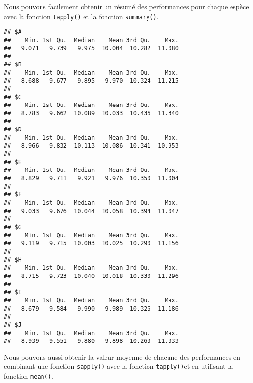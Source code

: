 \documentclass[]{book}
\newenvironment{Shaded}{\begin{snugshade}}{\end{snugshade}}
\newcommand{\KeywordTok}[1]{\textcolor[rgb]{0.13,0.29,0.53}{\textbf{#1}}}
\newcommand{\DataTypeTok}[1]{\textcolor[rgb]{0.13,0.29,0.53}{#1}}
\newcommand{\DecValTok}[1]{\textcolor[rgb]{0.00,0.00,0.81}{#1}}
\newcommand{\ControlFlowTok}[1]{\textcolor[rgb]{0.13,0.29,0.53}{\textbf{#1}}}
\newcommand{\OperatorTok}[1]{\textcolor[rgb]{0.81,0.36,0.00}{\textbf{#1}}}
\newcommand{\NormalTok}[1]{#1}
\theoremstyle{definition}
\theoremstyle{definition}
\theoremstyle{definition}
\theoremstyle{remark}
\begin{document}
Nous pouvons facilement obtenir un résumé des performances pour chaque
espèce avec la fonction \texttt{tapply()} et la fonction
\texttt{summary()}.

\begin{Shaded}
\end{Shaded}

\begin{verbatim}
## $A
##    Min. 1st Qu.  Median    Mean 3rd Qu.    Max. 
##   9.071   9.739   9.975  10.004  10.282  11.080 
## 
## $B
##    Min. 1st Qu.  Median    Mean 3rd Qu.    Max. 
##   8.688   9.677   9.895   9.970  10.324  11.215 
## 
## $C
##    Min. 1st Qu.  Median    Mean 3rd Qu.    Max. 
##   8.783   9.662  10.089  10.033  10.436  11.340 
## 
## $D
##    Min. 1st Qu.  Median    Mean 3rd Qu.    Max. 
##   8.966   9.832  10.113  10.086  10.341  10.953 
## 
## $E
##    Min. 1st Qu.  Median    Mean 3rd Qu.    Max. 
##   8.829   9.711   9.921   9.976  10.350  11.004 
## 
## $F
##    Min. 1st Qu.  Median    Mean 3rd Qu.    Max. 
##   9.033   9.676  10.044  10.058  10.394  11.047 
## 
## $G
##    Min. 1st Qu.  Median    Mean 3rd Qu.    Max. 
##   9.119   9.715  10.003  10.025  10.290  11.156 
## 
## $H
##    Min. 1st Qu.  Median    Mean 3rd Qu.    Max. 
##   8.715   9.723  10.040  10.018  10.330  11.296 
## 
## $I
##    Min. 1st Qu.  Median    Mean 3rd Qu.    Max. 
##   8.679   9.584   9.990   9.989  10.326  11.186 
## 
## $J
##    Min. 1st Qu.  Median    Mean 3rd Qu.    Max. 
##   8.939   9.551   9.880   9.898  10.263  11.333
\end{verbatim}

Nous pouvons aussi obtenir la valeur moyenne de chacune des performances
en combinant une fonction \texttt{sapply()} avec la fonction
\texttt{tapply()}et en utilisant la fonction \texttt{mean()}.

\begin{Shaded}
\end{Shaded}
\end{document}
